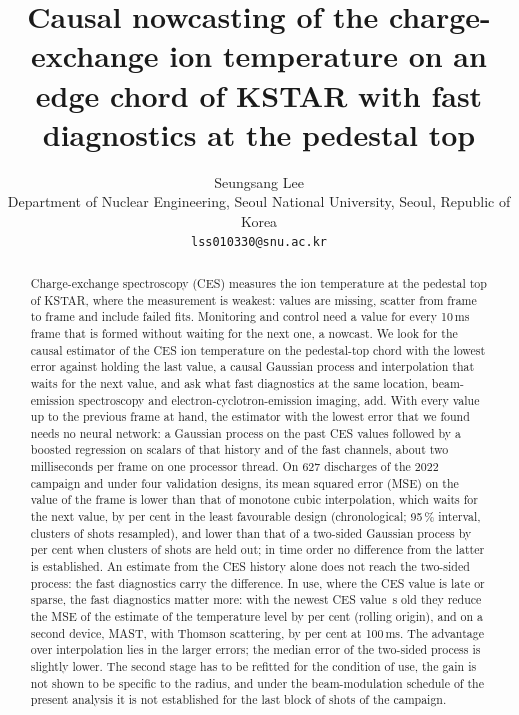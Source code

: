 \documentclass[11pt,a4paper]{article}
\title{Causal nowcasting of the charge-exchange ion temperature on an edge chord of KSTAR
with fast diagnostics at the pedestal top}
\author{Seungsang Lee\\
  {\small Department of Nuclear Engineering, Seoul National University, Seoul, Republic of Korea}\\
  {\small\texttt{lss010330@snu.ac.kr}}}
\date{}
\begin{document}
\maketitle

\begin{abstract}
\noindent
Charge-exchange spectroscopy (CES) measures the ion temperature at the pedestal top of
KSTAR, where the measurement is weakest: values are missing, scatter from frame to frame
and include failed fits. Monitoring and control need a value for every 10\,ms frame that
is formed without waiting for the next one, a nowcast. We look for the causal estimator
of the CES ion temperature on the pedestal-top chord with the lowest error against
holding the last value, a causal Gaussian process and interpolation that waits for the
next value, and ask what fast diagnostics at the same location, beam-emission
spectroscopy and electron-cyclotron-emission imaging, add. With every value up to the
previous frame at hand, the estimator with the lowest error that we found needs no neural
network: a Gaussian process on the past CES values followed by a boosted
regression on scalars of that history and of the fast channels, about two milliseconds
per frame on one processor thread. On 627 discharges of the 2022 campaign and under four
validation designs, its mean squared error (MSE) on the value of the frame is lower than
that of monotone cubic interpolation, which waits for the next value, by
\TXoverPchipVfoura{} per cent in the least favourable design (chronological; 95\,\%
interval, clusters of shots resampled), and lower than that of a two-sided Gaussian
process by \TXoverOfflineVtwo{} per cent when clusters of shots are held out; in time
order no difference from the latter is established. An estimate from the CES history alone does not reach
the two-sided process: the fast diagnostics carry the difference. In use, where the CES
value is late or sparse, the fast diagnostics matter more: with the newest CES value
\AgeMedianS\,s old they reduce the MSE of the estimate of the temperature level by
\IncDsixfiftyVthree{} per cent (rolling origin), and on a second device, MAST, with
Thomson scattering, by \IncMastDhundredMthree{} per cent at 100\,ms. The advantage over
interpolation lies in the larger errors; the median error of the two-sided process is
slightly lower. The second stage has to be refitted for the condition of use,
the gain is not shown to be specific to the radius, and under the beam-modulation
schedule of the present analysis it is not established for the last block of shots of
the campaign.
\end{abstract}
\end{document}
